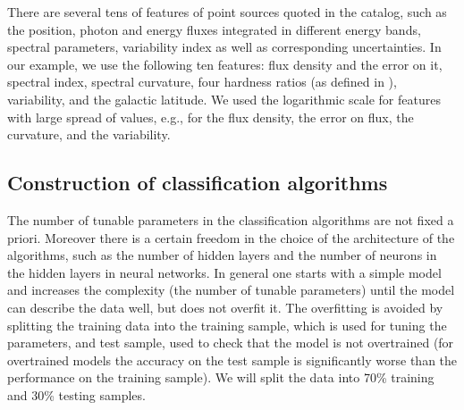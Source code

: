 There are several tens of features of point sources quoted in the catalog, such as the position, photon and energy fluxes integrated in different energy bands, spectral parameters, variability index as well as corresponding uncertainties.
In our example, we use the following ten features:
flux density and the error on it, spectral index, spectral curvature, four hardness ratios (as defined in \cite{2016ApJ...820....8S}), variability, and the galactic latitude. 
We used the logarithmic scale for features with large spread of values, e.g., for the flux density, the error on flux, the curvature, and the variability. 

\subsection{Construction of classification algorithms}

The number of tunable parameters in the classification algorithms are not fixed a priori. 
Moreover there is a certain freedom in the choice of the architecture of the algorithms, such as
the number of hidden layers and the number of neurons in the hidden layers in neural networks.
In general one starts with a simple model and increases the complexity (the number of tunable parameters)
until the model can describe the data well, but does not overfit it.
The overfitting is avoided by splitting the training data into the training sample, which is used for tuning the parameters,
and test sample, used to check that the model is not overtrained (for overtrained models the accuracy on the test
sample is significantly worse than the performance on the training sample).
We will split the data into 70\% training and 30\% testing samples.


